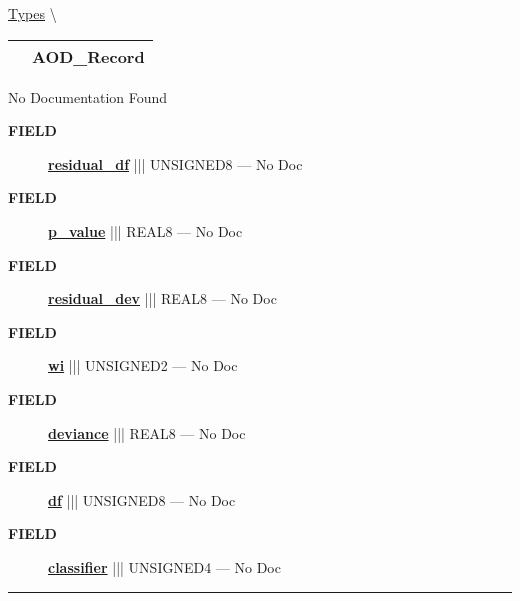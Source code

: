 \hypertarget{ecldoc:logisticregression.types.aod_record}{}
\hspace{0pt} \hyperlink{ecldoc:LogisticRegression.Types}{Types} \textbackslash 

{\renewcommand{\arraystretch}{1.5}
\begin{tabularx}{\textwidth}{|>{\raggedright\arraybackslash}l|X|}
\hline
\hspace{0pt}\mytexttt{\color{red} } & \textbf{AOD\_Record} \\
\hline
\end{tabularx}
}

\par





No Documentation Found







\par
\begin{description}
\item [\colorbox{tagtype}{\color{white} \textbf{\textsf{FIELD}}}] \textbf{\underline{residual\_df}} ||| UNSIGNED8 --- No Doc
\item [\colorbox{tagtype}{\color{white} \textbf{\textsf{FIELD}}}] \textbf{\underline{p\_value}} ||| REAL8 --- No Doc
\item [\colorbox{tagtype}{\color{white} \textbf{\textsf{FIELD}}}] \textbf{\underline{residual\_dev}} ||| REAL8 --- No Doc
\item [\colorbox{tagtype}{\color{white} \textbf{\textsf{FIELD}}}] \textbf{\underline{wi}} ||| UNSIGNED2 --- No Doc
\item [\colorbox{tagtype}{\color{white} \textbf{\textsf{FIELD}}}] \textbf{\underline{deviance}} ||| REAL8 --- No Doc
\item [\colorbox{tagtype}{\color{white} \textbf{\textsf{FIELD}}}] \textbf{\underline{df}} ||| UNSIGNED8 --- No Doc
\item [\colorbox{tagtype}{\color{white} \textbf{\textsf{FIELD}}}] \textbf{\underline{classifier}} ||| UNSIGNED4 --- No Doc
\end{description}





\rule{\linewidth}{0.5pt}


